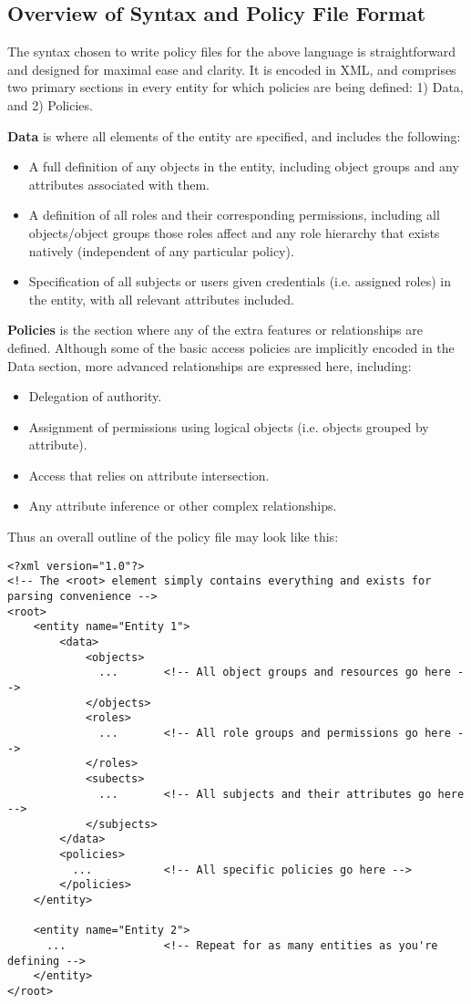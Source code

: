 \documentclass{article}
\providecommand{\tightlist}{
    \setlength{\itemsep}{1pt}\setlength{\parskip}{0pt}
}
\begin{document}
\subsection{Overview of Syntax and Policy File Format}
The syntax chosen to write policy files for the above language is straightforward and designed for maximal ease and clarity. It is encoded in XML, and comprises two primary sections in every entity for which policies are being defined: 1) Data, and 2) Policies. \par
\textbf{Data} is where all elements of the entity are specified, and includes the following:
\begin{itemize}\tightlist
  \item A full definition of any objects in the entity, including object groups and any attributes associated with them.
  \item A definition of all roles and their corresponding permissions, including all objects/object groups those roles affect and any role hierarchy that exists natively (independent of any particular policy).
  \item Specification of all subjects or users given credentials (i.e. assigned roles) in the entity, with all relevant attributes included.
\end{itemize}
\textbf{Policies} is the section where any of the extra features or relationships are defined. Although some of the basic access policies are implicitly encoded in the Data section, more advanced relationships are expressed here, including:
\begin{itemize}\tightlist
  \item Delegation of authority.
  \item Assignment of permissions using logical objects (i.e. objects grouped by attribute).
  \item Access that relies on attribute intersection.
  \item Any attribute inference or other complex relationships.
\end{itemize}

Thus an overall outline of the policy file may look like this: \\
\begin{lstlisting}
<?xml version="1.0"?>
<!-- The <root> element simply contains everything and exists for parsing convenience -->
<root>
    <entity name="Entity 1">
        <data>
            <objects>
              ...       <!-- All object groups and resources go here -->
            </objects>
            <roles>
              ...       <!-- All role groups and permissions go here -->
            </roles>
            <subects>
              ...       <!-- All subjects and their attributes go here -->
            </subjects>
        </data>
        <policies>
          ...           <!-- All specific policies go here -->
        </policies>
    </entity>

    <entity name="Entity 2">
      ...               <!-- Repeat for as many entities as you're defining -->
    </entity>
</root>
\end{lstlisting}
\end{document}
